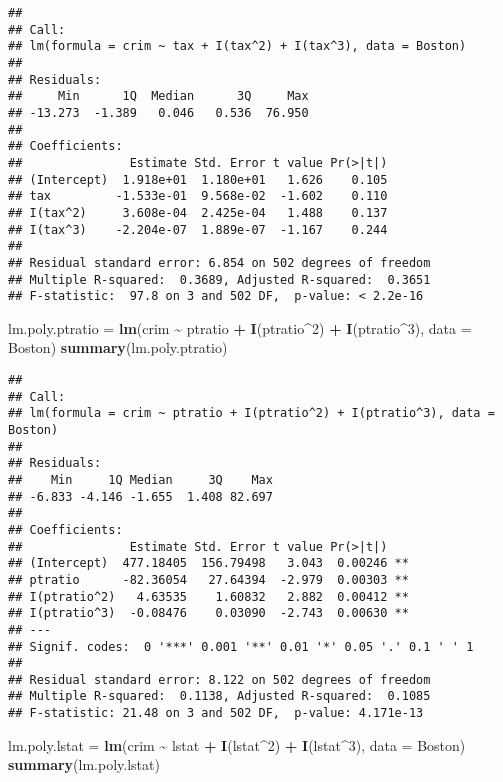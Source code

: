\documentclass[
]{article}
\newenvironment{Shaded}{\begin{snugshade}}{\end{snugshade}}
\newcommand{\AttributeTok}[1]{\textcolor[rgb]{0.13,0.29,0.53}{#1}}
\newcommand{\DecValTok}[1]{\textcolor[rgb]{0.00,0.00,0.81}{#1}}
\newcommand{\FunctionTok}[1]{\textcolor[rgb]{0.13,0.29,0.53}{\textbf{#1}}}
\newcommand{\NormalTok}[1]{#1}
\newcommand{\OtherTok}[1]{\textcolor[rgb]{0.56,0.35,0.01}{#1}}
\newcommand{\SpecialCharTok}[1]{\textcolor[rgb]{0.81,0.36,0.00}{\textbf{#1}}}
\begin{document}
\begin{verbatim}
## 
## Call:
## lm(formula = crim ~ tax + I(tax^2) + I(tax^3), data = Boston)
## 
## Residuals:
##     Min      1Q  Median      3Q     Max 
## -13.273  -1.389   0.046   0.536  76.950 
## 
## Coefficients:
##               Estimate Std. Error t value Pr(>|t|)
## (Intercept)  1.918e+01  1.180e+01   1.626    0.105
## tax         -1.533e-01  9.568e-02  -1.602    0.110
## I(tax^2)     3.608e-04  2.425e-04   1.488    0.137
## I(tax^3)    -2.204e-07  1.889e-07  -1.167    0.244
## 
## Residual standard error: 6.854 on 502 degrees of freedom
## Multiple R-squared:  0.3689, Adjusted R-squared:  0.3651 
## F-statistic:  97.8 on 3 and 502 DF,  p-value: < 2.2e-16
\end{verbatim}

\begin{Shaded}
\begin{Highlighting}[]
\NormalTok{lm.poly.ptratio }\OtherTok{=} \FunctionTok{lm}\NormalTok{(crim }\SpecialCharTok{\textasciitilde{}}\NormalTok{ ptratio }\SpecialCharTok{+} \FunctionTok{I}\NormalTok{(ptratio}\SpecialCharTok{\^{}}\DecValTok{2}\NormalTok{) }\SpecialCharTok{+} \FunctionTok{I}\NormalTok{(ptratio}\SpecialCharTok{\^{}}\DecValTok{3}\NormalTok{), }\AttributeTok{data =}\NormalTok{ Boston)}
\FunctionTok{summary}\NormalTok{(lm.poly.ptratio)}
\end{Highlighting}
\end{Shaded}

\begin{verbatim}
## 
## Call:
## lm(formula = crim ~ ptratio + I(ptratio^2) + I(ptratio^3), data = Boston)
## 
## Residuals:
##    Min     1Q Median     3Q    Max 
## -6.833 -4.146 -1.655  1.408 82.697 
## 
## Coefficients:
##               Estimate Std. Error t value Pr(>|t|)   
## (Intercept)  477.18405  156.79498   3.043  0.00246 **
## ptratio      -82.36054   27.64394  -2.979  0.00303 **
## I(ptratio^2)   4.63535    1.60832   2.882  0.00412 **
## I(ptratio^3)  -0.08476    0.03090  -2.743  0.00630 **
## ---
## Signif. codes:  0 '***' 0.001 '**' 0.01 '*' 0.05 '.' 0.1 ' ' 1
## 
## Residual standard error: 8.122 on 502 degrees of freedom
## Multiple R-squared:  0.1138, Adjusted R-squared:  0.1085 
## F-statistic: 21.48 on 3 and 502 DF,  p-value: 4.171e-13
\end{verbatim}

\begin{Shaded}
\begin{Highlighting}[]
\NormalTok{lm.poly.lstat }\OtherTok{=} \FunctionTok{lm}\NormalTok{(crim }\SpecialCharTok{\textasciitilde{}}\NormalTok{ lstat }\SpecialCharTok{+} \FunctionTok{I}\NormalTok{(lstat}\SpecialCharTok{\^{}}\DecValTok{2}\NormalTok{) }\SpecialCharTok{+} \FunctionTok{I}\NormalTok{(lstat}\SpecialCharTok{\^{}}\DecValTok{3}\NormalTok{), }\AttributeTok{data =}\NormalTok{ Boston)}
\FunctionTok{summary}\NormalTok{(lm.poly.lstat)}
\end{Highlighting}
\end{Shaded}
\end{document}
